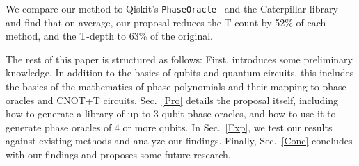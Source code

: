 We compare our method to Qiskit's \texttt{PhaseOracle}~\cite{bib-phaseoracle} and the Caterpillar
library~\cite{bib-meuli-ros} and find that on average, our proposal reduces the T-count by 52\% of
each method, and the T-depth to 63\% of the original.

The rest of this paper is structured as follows: First, 
introduces some preliminary knowledge. In addition to the basics of
qubits and quantum circuits, this includes the basics of the
mathematics of phase polynomials and their mapping to phase oracles
and CNOT+T circuits. Sec.~\ref{Pro} details the proposal itself,
including how to generate a library of up to 3-qubit phase oracles,
and how to use it to generate phase oracles of 4 or more qubits.
In Sec.~\ref{Exp}, we test our results against existing methods
and analyze our findings. Finally, Sec.~\ref{Conc} concludes with
our findings and proposes some future research.

